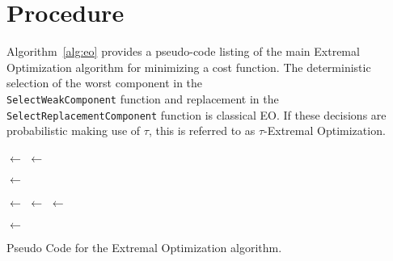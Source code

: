 \documentclass[a4paper, 11pt]{article}
\begin{document}
\section{Procedure}
\label{sec:procedure}
Algorithm~\ref{alg:eo} provides a pseudo-code listing of the main Extremal Optimization algorithm for minimizing a cost function. The deterministic selection of the worst component in the \\ \texttt{SelectWeakComponent} function and replacement in the \texttt{SelectReplacementComponent} function is classical EO. If these decisions are probabilistic making use of $\tau$, this is referred to as $\tau$-Extremal Optimization.

\begin{algorithm}[ht]
	\SetLine  


	
	\KwIn{\ProblemSize, \MaxIterations, \TauParam}		
	\KwOut{\Best}
  
	\Current $\leftarrow$ \CreateInitialSolution{\ProblemSize}\;
	\Best $\leftarrow$ \Current\;
	 {
		\ForEach{\Component $\in$ \Current}{
			\ComponentCost $\leftarrow$ \Cost{\Component, \Current}\;
		}
		\RankedComponents $\leftarrow$ \Rank{\CandidateComponents}
		
		\Component $\leftarrow$ \SelectWeakComponent{\RankedComponents, \Component, \TauParam}\;
		\OtherComponent $\leftarrow$ \SelectReplacementComponent{\RankedComponents, \TauParam}\;
		\Candidate $\leftarrow$ \Replace{\Current, \Component, \OtherComponent}\;
	
		\If{\Cost{\Candidate} $\leq$ \Cost{\Best}} {
			\Best $\leftarrow$ \Candidate\;
		}
	}
	\Return{\Best}\;
	\caption{Pseudo Code for the Extremal Optimization algorithm.}
	\label{alg:eo}
\end{algorithm}
\end{document}
